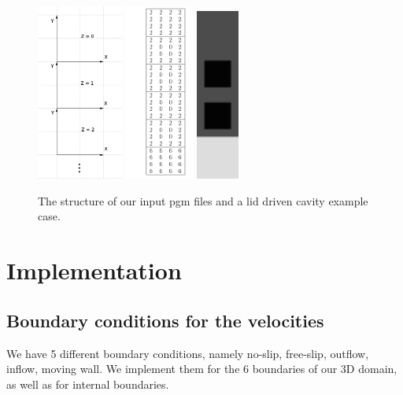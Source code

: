\documentclass[a4paper, 12pt]{article}
\begin{document}
\begin{figure}[hb!]
\centering
\label{fig1}
\includegraphics[height=5.8cm]{coord.jpg}
\includegraphics[height=5.8cm]{cavity2.jpg}
\includegraphics[height=5.65cm]{cavity20202.jpg}
\caption{The structure of our input pgm files and a lid driven cavity example case.}
\end{figure}


\section{Implementation}
\subsection{Boundary conditions for the velocities}
We have 5 different boundary conditions, namely no-slip, free-slip, outflow, inflow, moving wall. We implement them for the 6 boundaries of our 3D domain, as well as for internal boundaries.
\end{document}
